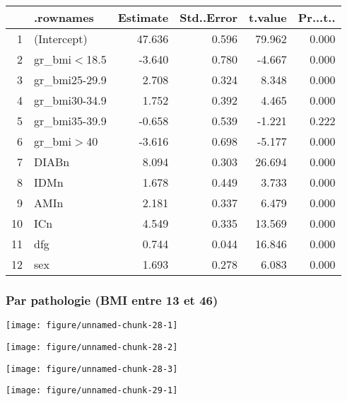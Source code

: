 \documentclass[11pt,a4paper]{article}\usepackage[]{graphicx}\usepackage[]{color}
\makeatletter
\def\maxwidth{ %
  \ifdim\Gin@nat@width>\linewidth
    \linewidth
  \else
    \Gin@nat@width
  \fi
}
\newenvironment{knitrout}{}{} %
\makeatother
\begin{document}
\begin{table}[H]
\centering
\begin{tabular}{rlrrrr}
  \hline
 & .rownames & Estimate & Std..Error & t.value & Pr...t.. \\ 
  \hline
1 & (Intercept) & 47.636 & 0.596 & 79.962 & 0.000 \\ 
  2 & gr\_bmi$<$18.5 & -3.640 & 0.780 & -4.667 & 0.000 \\ 
  3 & gr\_bmi25-29.9 & 2.708 & 0.324 & 8.348 & 0.000 \\ 
  4 & gr\_bmi30-34.9 & 1.752 & 0.392 & 4.465 & 0.000 \\ 
  5 & gr\_bmi35-39.9 & -0.658 & 0.539 & -1.221 & 0.222 \\ 
  6 & gr\_bmi$>$40 & -3.616 & 0.698 & -5.177 & 0.000 \\ 
  7 & DIABn & 8.094 & 0.303 & 26.694 & 0.000 \\ 
  8 & IDMn & 1.678 & 0.449 & 3.733 & 0.000 \\ 
  9 & AMIn & 2.181 & 0.337 & 6.479 & 0.000 \\ 
  10 & ICn & 4.549 & 0.335 & 13.569 & 0.000 \\ 
  11 & dfg & 0.744 & 0.044 & 16.846 & 0.000 \\ 
  12 & sex & 1.693 & 0.278 & 6.083 & 0.000 \\ 
   \hline
\end{tabular}
\end{table}


\subsubsection*{Par pathologie (BMI entre 13 et 46)}

\begin{knitrout}
\color{fgcolor}
\texttt{[image: figure/unnamed-chunk-28-1]} 

\texttt{[image: figure/unnamed-chunk-28-2]} 

\texttt{[image: figure/unnamed-chunk-28-3]} 

\end{knitrout}

\begin{knitrout}
\color{fgcolor}
\texttt{[image: figure/unnamed-chunk-29-1]} 

\end{knitrout}
\end{document}
